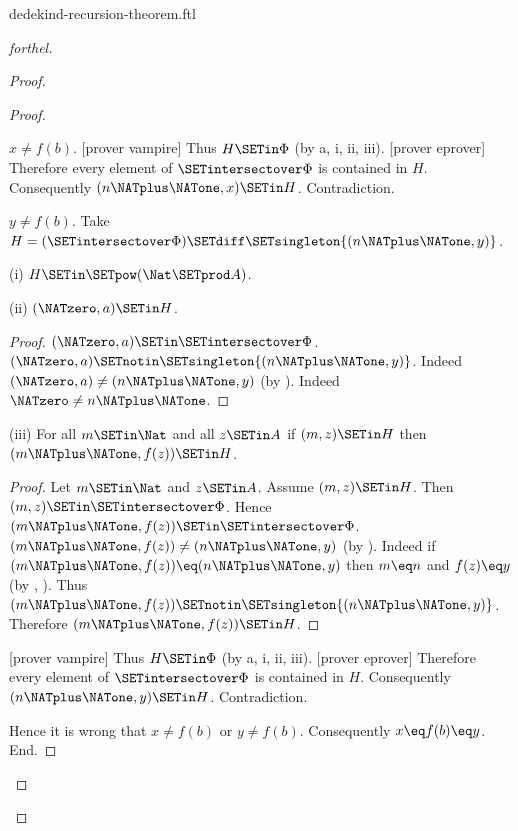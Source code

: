 \documentclass{stex}
\begin{document}
\begin{smodule}{dedekind-recursion-theorem.ftl}
\begin{proof}[forthel]
\begin{proof}
\begin{proof}
\begin{case}{$x \neq f(b)$.}
          [prover vampire]
          Thus $H \SETin \Phi$ (by a, i, ii, iii).
          [prover eprover]
          Therefore every element of $\SETintersectover \Phi$ is contained in $H$.
          Consequently $(n \NATplus \NATone,x) \SETin H$.
          Contradiction.
        \end{case}

        \begin{case}{$y \neq f(b)$.}
          Take $H = (\SETintersectover \Phi) \SETdiff \SETsingleton{(n \NATplus \NATone,y)}$.

          (i) $H \SETin \SETpow(\Nat \SETprod A)$.

          (ii) $(\NATzero,a) \SETin H$.
          \begin{proof}
            $(\NATzero,a) \SETin \SETintersectover \Phi$.
            $(\NATzero,a) \SETnotin \SETsingleton{(n \NATplus \NATone,y)}$.
            Indeed $(\NATzero,a) \neq (n \NATplus \NATone,y)$ (by ).
            Indeed $\NATzero \neq n \NATplus \NATone$.
          \end{proof}

          (iii) For all $m \SETin \Nat$ and all $z \SETin A$ if $(m,z) \SETin H$ then $(m \NATplus \NATone,f(z)) \SETin H$.
          \begin{proof}
            Let $m \SETin \Nat$ and $z \SETin A$.
            Assume $(m,z) \SETin H$.
            Then $(m,z) \SETin \SETintersectover \Phi$.
            Hence $(m \NATplus \NATone,f(z)) \SETin \SETintersectover \Phi$.
            $(m \NATplus \NATone,f(z)) \neq (n \NATplus \NATone,y)$ (by ).
            Indeed if $(m \NATplus \NATone,f(z)) \eq (n \NATplus \NATone,y)$ then $m \eq n$ and $f(z) \eq y$ (by , ).
            Thus $(m \NATplus \NATone,f(z)) \SETnotin \SETsingleton{(n \NATplus \NATone,y)}$.
            Therefore $(m \NATplus \NATone,f(z)) \SETin H$.
          \end{proof}

          [prover vampire]
          Thus $H \SETin \Phi$ (by a, i, ii, iii).
          [prover eprover]
          Therefore every element of $\SETintersectover \Phi$ is contained in $H$.
          Consequently $(n \NATplus \NATone,y) \SETin H$.
          Contradiction.
        \end{case}

        Hence it is wrong that $x \neq f(b)$ or $y \neq f(b)$.
        Consequently $x \eq f(b) \eq y$.
      End.


\end{proof}
\end{proof}
\end{proof}
\end{smodule}
\end{document}
